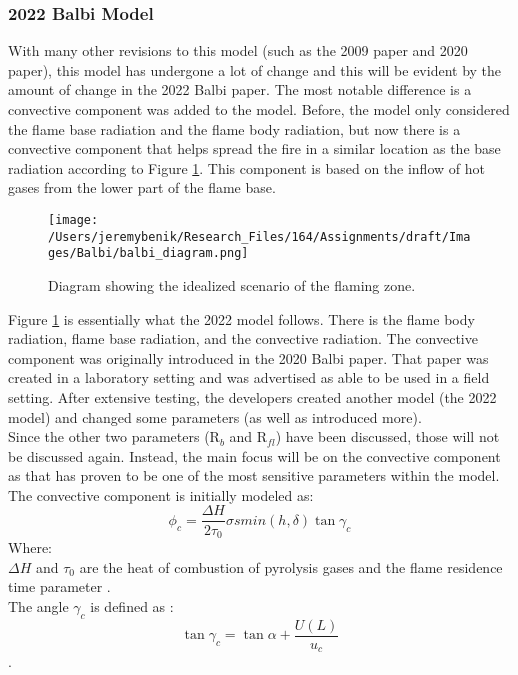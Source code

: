 \documentclass{article}
\begin{document}
\subsubsection*{2022 Balbi Model}
\indent With many other revisions to this model (such as the 2009 paper and 2020 paper), this model has undergone a lot of change and this will be evident by the amount of change in the 2022 Balbi paper. The most notable difference is a convective component was added to the model. Before, the model only considered the flame base radiation and the flame body radiation, but now there is a convective component that helps spread the fire in a similar location as the base radiation according to Figure \ref{Balbi_flame_diagram}. This component is based on the inflow of hot gases from the lower part of the flame base. \\
\begin{figure}[h]
\centering
  \texttt{[image: /Users/jeremybenik/Research\_Files/164/Assignments/draft/Images/Balbi/balbi\_diagram.png]}
  \caption{Diagram showing the idealized scenario of the flaming zone.}
  \label{Balbi_flame_diagram}
\end{figure}
\indent Figure \ref{Balbi_flame_diagram} is essentially what the 2022 model follows. There is the flame body radiation, flame base radiation, and the convective radiation. The convective component was originally introduced in the 2020 Balbi paper. That paper was created in a laboratory setting and was advertised as able to be used in a field setting. After extensive testing, the developers created another model (the 2022 model) and changed some parameters (as well as introduced more). \\
\indent Since the other two parameters (R$_b$ and R$_{fl}$) have been discussed, those will not be discussed again. Instead, the main focus will be on the convective component as that has proven to be one of the most sensitive parameters within the model. The convective component is initially modeled as:
\begin{equation}
	\label{convection intro}
	\phi _ c = \frac {\Delta H} {2 \tau _ 0} \sigma s min(h, \delta) \tan \gamma _ c
\end{equation}
Where: \\
$\Delta H$ and $\tau _ 0$ are the heat of combustion of pyrolysis gases and the flame residence time parameter \citep{Chatelon2022}.\\
\indent The angle $\gamma _ {c}$ is defined as :
\begin{equation}
	\tan \gamma _ {c} = \tan \alpha + \frac {U(L)} {u_{c}}
\end{equation}. 
\end{document}
